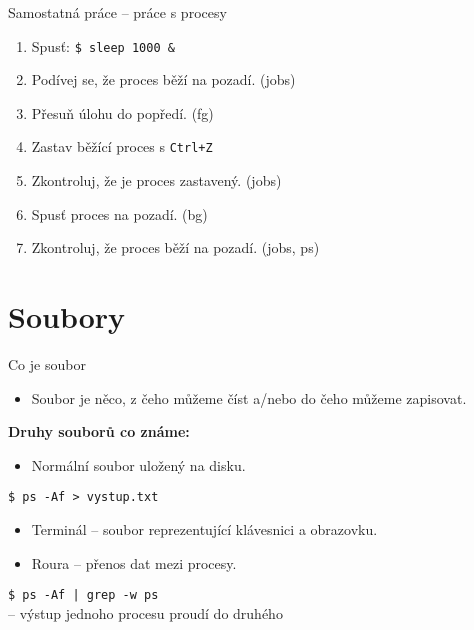 \documentclass{beamer}
\begin{document}
\begin{frame}{Samostatná práce – práce s procesy}
	\begin{enumerate}
		\item Spusť: \texttt{\$ sleep 1000 \&} 
		\item Podívej se, že proces běží na pozadí. (jobs)
		\item Přesuň úlohu do popředí. (fg)
		\item Zastav běžící proces s \texttt{Ctrl+Z}
		\item Zkontroluj, že je proces zastavený. (jobs)
		\item Spusť proces na pozadí. (bg)
		\item Zkontroluj, že proces běží na pozadí. (jobs, ps)
	\end{enumerate}
\end{frame}

\section{Soubory}

\begin{frame}[fragile]{Co je soubor}
	\begin{itemize}
		\item Soubor je něco, z čeho můžeme číst a/nebo do čeho můžeme zapisovat.
	\end{itemize}

	\vspace{1.8em}
	\textbf{Druhy souborů co známe:}
	\begin{itemize}
		\item Normální soubor uložený na disku.
	\end{itemize}
	\hspace{2em}\texttt{\$ ps -Af > vystup.txt} \\

	\begin{itemize}			
		\item Terminál – soubor reprezentující klávesnici a obrazovku.
		\item Roura – přenos dat mezi procesy.
	\end{itemize}
	
	\vspace{0.5em}
	\hspace{2em}\texttt{\$ ps -Af | grep -w ps} \\
	\hspace{2em}– výstup jednoho procesu proudí do druhého
\end{frame}
\end{document}
